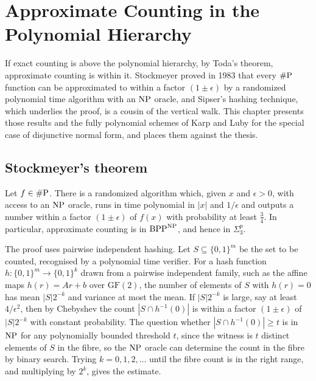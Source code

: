 \chapter{Approximate Counting in the Polynomial Hierarchy}
\label{ch:approx}

If exact counting is above the polynomial hierarchy, by Toda's theorem, approximate counting is within it. Stockmeyer proved in 1983 that every $\#\mathrm{P}$ function can be approximated to within a factor $(1 \pm \epsilon)$ by a randomized polynomial time algorithm with an $\mathrm{NP}$ oracle, and Sipser's hashing technique, which underlies the proof, is a cousin of the vertical walk. This chapter presents those results and the fully polynomial schemes of Karp and Luby for the special case of disjunctive normal form, and places them against the thesis.

\section{Stockmeyer's theorem}

\begin{theorem}[Stockmeyer]
Let $f \in \#\mathrm{P}$. There is a randomized algorithm which, given $x$ and $\epsilon > 0$, with access to an $\mathrm{NP}$ oracle, runs in time polynomial in $|x|$ and $1/\epsilon$ and outputs a number within a factor $(1 \pm \epsilon)$ of $f(x)$ with probability at least $\tfrac34$. In particular, approximate counting is in $\mathrm{BPP}^{\mathrm{NP}}$, and hence in $\Sigma_3^p$.
\end{theorem}

The proof uses pairwise independent hashing. Let $S \subseteq \{0,1\}^m$ be the set to be counted, recognised by a polynomial time verifier. For a hash function $h : \{0,1\}^m \to \{0,1\}^k$ drawn from a pairwise independent family, such as the affine maps $h(r) = Ar + b$ over $\mathrm{GF}(2)$, the number of elements of $S$ with $h(r) = 0$ has mean $|S| 2^{-k}$ and variance at most the mean. If $|S| 2^{-k}$ is large, say at least $4/\epsilon^2$, then by Chebyshev the count $|S \cap h^{-1}(0)|$ is within a factor $(1 \pm \epsilon)$ of $|S| 2^{-k}$ with constant probability. The question whether $|S \cap h^{-1}(0)| \ge t$ is in $\mathrm{NP}$ for any polynomially bounded threshold $t$, since the witness is $t$ distinct elements of $S$ in the fibre, so the $\mathrm{NP}$ oracle can determine the count in the fibre by binary search. Trying $k = 0, 1, 2, \dots$ until the fibre count is in the right range, and multiplying by $2^k$, gives the estimate.

